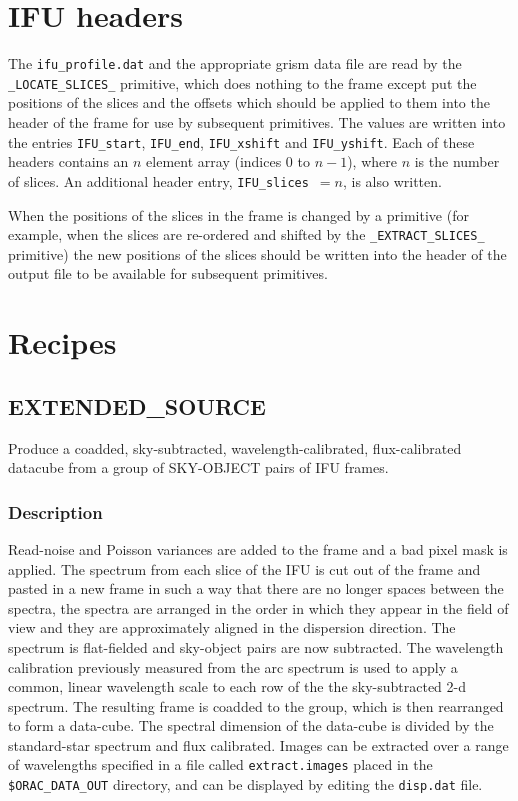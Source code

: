 \documentclass[twoside,11pt,nolof]{starlink}
\begin{document}
\section{IFU headers}

The \texttt{ifu\_profile.dat} and the appropriate grism data file are read
by the \texttt{\_LOCATE\_SLICES\_} primitive, which does nothing to the
frame except put the positions of the slices and the offsets which
should be applied to them into the header of the frame for use by
subsequent primitives. The values are written into the entries \texttt{IFU\_start}, \texttt{IFU\_end}, \texttt{IFU\_xshift} and \texttt{IFU\_yshift}. Each of these headers contains an $n$ element array
(indices 0 to $n-1$), where $n$ is the number of slices. An additional
header entry, \texttt{IFU\_slices}~$=n$, is also written.

When the positions of the slices in the frame is changed by a
primitive (for example, when the slices are re-ordered and shifted by
the \texttt{\_EXTRACT\_SLICES\_} primitive) the new positions of the
slices should be written into the header of the output file to be
available for subsequent primitives.




\clearpage


\section{Recipes}

\subsection{EXTENDED\_SOURCE}

Produce a coadded, sky-subtracted, wavelength-calibrated,
flux-calibrated datacube from a group of SKY-OBJECT pairs of IFU
frames.

\subsubsection*{Description}

Read-noise and Poisson variances are added to the frame and a bad
pixel mask is applied. The spectrum from each slice of the IFU is cut
out of the frame and pasted in a new frame in such a way that there
are no longer spaces between the spectra, the spectra are arranged in
the order in which they appear in the field of view and they are
approximately aligned in the dispersion direction. The spectrum is
flat-fielded and sky-object pairs are now subtracted.  The wavelength
calibration previously measured from the arc spectrum is used to apply
a common, linear wavelength scale to each row of the the
sky-subtracted 2-d spectrum.  The resulting frame is coadded to the
group, which is then rearranged to form a data-cube. The spectral
dimension of the data-cube is divided by the standard-star spectrum
and flux calibrated. Images can be extracted over a range of
wavelengths specified in a file called \texttt{extract.images} placed in
the \texttt{\$ORAC\_DATA\_OUT} directory, and can be displayed by editing
the \texttt{disp.dat} file.
\end{document}
